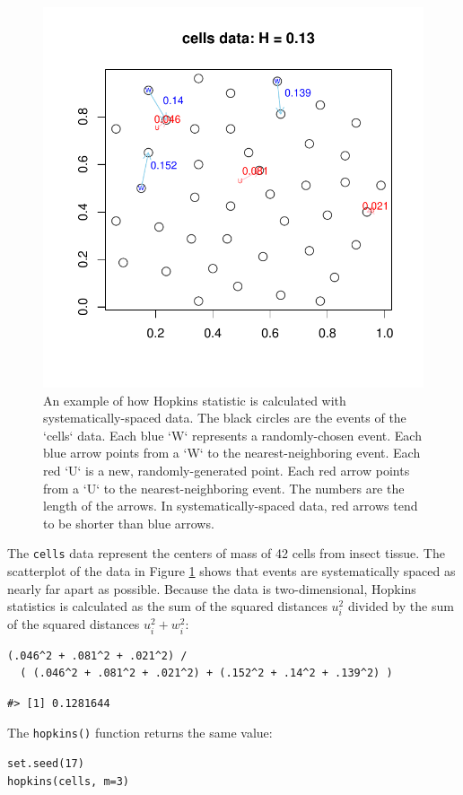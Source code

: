 \begin{figure}

{\centering \includegraphics[width=0.6\linewidth]{hopkins_files/figure-latex/cells-1} 

}

\caption{An example of how Hopkins statistic is calculated with systematically-spaced data. The black circles are the events of the `cells` data. Each blue `W` represents a randomly-chosen event. Each blue arrow points from a `W` to the nearest-neighboring event. Each red `U` is a new, randomly-generated point. Each red arrow points from a `U` to the nearest-neighboring event. The numbers are the length of the arrows. In systematically-spaced data, red arrows tend to be shorter than blue arrows.}\label{fig:cells}
\end{figure}

The \texttt{cells} data represent the centers of mass of 42 cells from insect tissue. The scatterplot of the data in Figure \ref{fig:cells} shows that events are systematically spaced as nearly far apart as possible. Because the data is two-dimensional, Hopkins statistics is calculated as the sum of the squared distances \(u_i^2\) divided by the sum of the squared distances \(u_i^2 + w_i^2\):

\begin{verbatim}
(.046^2 + .081^2 + .021^2) / 
  ( (.046^2 + .081^2 + .021^2) + (.152^2 + .14^2 + .139^2) )
\end{verbatim}

\begin{verbatim}
#> [1] 0.1281644
\end{verbatim}

The \texttt{hopkins()} function returns the same value:

\begin{verbatim}
set.seed(17)
hopkins(cells, m=3)
\end{verbatim}

